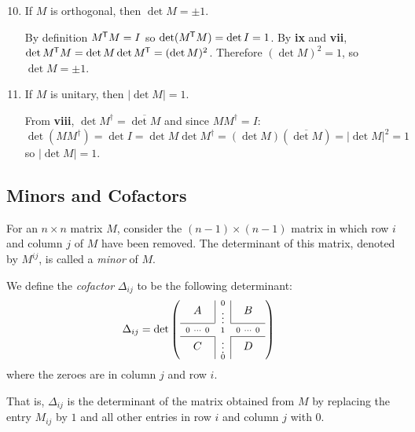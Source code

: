 \documentclass[../main.tex]{subfiles}
\begin{document}
\begin{enumerate}
  \setcounter{enumi}{9}
  \item If $M$ is orthogonal, then $\det M = \pm 1$.

    By definition $M^{{\mkern-1.5mu\mathsf{T}}} M = I$ so $\det(M^{{\mkern-1.5mu\mathsf{T}}} M) = \det I = 1$.
    By \textbf{ix} and \textbf{vii}, $\det M^{{\mkern-1.5mu\mathsf{T}}}M = \det M \det M^{{\mkern-1.5mu\mathsf{T}}} = (\det M)^2$.
    Therefore $(\det M)^2 = 1$, so $\det M = \pm 1$.
  \item If $M$ is unitary, then $|\det M| = 1$.

    From \textbf{viii}, $\det M^{\dag} = \overline{\det M}$ and since $M M^{\dag} = I$:
    \[
      \det(M M^{\dag}) = \det I = \det M \det M^{\dag} = (\det M)(\overline{\det M}) = |\det M|^2 = 1
    \]
    so $|\det M| =  1$.
\end{enumerate}
\subsection{Minors and Cofactors}
\begin{definition}[Minor]
  For an $n \times n$ matrix $M$, consider the $(n - 1) \times (n - 1)$ matrix in which row $i$ and column $j$ of $M$ have been removed.
  The determinant of this matrix, denoted by $M^{i j}$, is called a \textit{minor} of $M$.
\end{definition}
\begin{definition}[Cofactor]
  We define the \textit{cofactor} $\Delta_{i j}$ to be the following determinant:
  \begin{align*}
    \Delta_{i j} &= \det \left(\begin{array}{c c c}
                    A & \multicolumn{1}{|c}{\scriptstyle{\substack{0 \\ \vdots}}} & \multicolumn{1}{|c}{B} \\ \cline{1-1} \cline{3-3}
                    \scriptstyle{0\ \cdots\ 0} & \scriptstyle{1} & \scriptstyle{0\ \cdots\ 0} \\ \cline{1-1} \cline{3-3}
                    C & \multicolumn{1}{|c}{\scriptstyle{\substack{\vdots \\ 0}}} & \multicolumn{1}{|c}{D}
                    \end{array}\right)
  \end{align*}
  where the zeroes are in column $j$ and row $i$.

  That is, $\Delta_{i j}$ is the determinant of the matrix obtained from $M$ by replacing the entry $M_{i j}$ by $1$ and all other entries in row $i$ and column $j$ with $0$.
\end{definition}
\end{document}
